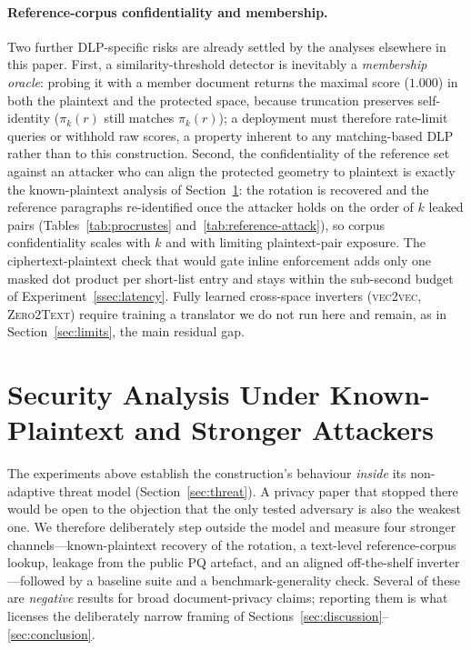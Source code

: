 \documentclass[11pt,a4paper]{article}
\begin{document}
\paragraph{Reference-corpus confidentiality and membership.} Two further
DLP-specific risks are already settled by the analyses elsewhere in this
paper. First, a similarity-threshold detector is inevitably a
\emph{membership oracle}: probing it with a member document returns the
maximal score ($1.000$) in both the plaintext and the protected space,
because truncation preserves self-identity ($\pi_k(r)$ still matches
$\pi_k(r)$); a deployment must therefore rate-limit queries or withhold
raw scores, a property inherent to any matching-based DLP rather than to
this construction. Second, the confidentiality of the reference set
against an attacker who can align the protected geometry to plaintext is
exactly the known-plaintext analysis of Section~\ref{sec:stronger}: the
rotation is recovered and the reference paragraphs re-identified once the
attacker holds on the order of $k$ leaked pairs
(Tables~\ref{tab:procrustes} and~\ref{tab:reference-attack}), so corpus
confidentiality scales with $k$ and with limiting plaintext-pair
exposure. The ciphertext-plaintext check that would gate inline
enforcement adds only one masked dot product per short-list entry and
stays within the sub-second budget of Experiment~\ref{ssec:latency}.
Fully learned cross-space inverters (\textsc{vec2vec},
\textsc{Zero2Text}) require training a translator we do not run here and
remain, as in Section~\ref{sec:limits}, the main residual gap.

\section{Security Analysis Under Known-Plaintext and Stronger Attackers}
\label{sec:stronger}

The experiments above establish the construction's behaviour \emph{inside}
its non-adaptive threat model (Section~\ref{sec:threat}). A privacy paper
that stopped there would be open to the objection that the only tested
adversary is also the weakest one. We therefore deliberately step outside
the model and measure four stronger channels---known-plaintext recovery of
the rotation, a text-level reference-corpus lookup, leakage from the public
PQ artefact, and an aligned off-the-shelf inverter---followed by a baseline
suite and a benchmark-generality check. Several of these are
\emph{negative} results for broad document-privacy claims; reporting them is
what licenses the deliberately narrow framing of
Sections~\ref{sec:discussion}--\ref{sec:conclusion}.
\end{document}
